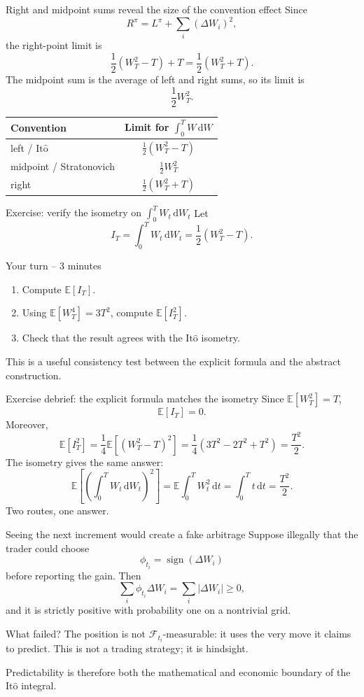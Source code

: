 \documentclass[10pt,aspectratio=169]{beamer}
\newcommand{\E}{\mathbb E}
\newcommand{\F}{\mathcal F}
\newcommand{\dd}{\,\mathrm d}
\newcommand{\Ito}{\mathrm{It\hat{o}}}
\begin{document}
\begin{frame}{Right and midpoint sums reveal the size of the convention effect}
Since
\[
R^\pi=L^\pi+\sum_i(\Delta W_i)^2,
\]
the right-point limit is
\[
\frac12(W_T^2-T)+T
=\frac12(W_T^2+T).
\]
The midpoint sum is the average of left and right sums, so its limit is
\[
\frac12W_T^2.
\]
\begin{center}
\begin{tabular}{lc}
\toprule
Convention & Limit for \(\int_0^T W\dd W\) \\
\midrule
left / \(\Ito\) & \(\frac12(W_T^2-T)\) \\
midpoint / Stratonovich & \(\frac12W_T^2\) \\
right & \(\frac12(W_T^2+T)\) \\
\bottomrule
\end{tabular}
\end{center}
\end{frame}

\begin{frame}{Exercise: verify the isometry on \(\int_0^T W_t\dd W_t\)}
Let
\[
I_T=\int_0^T W_t\dd W_t
=\frac12(W_T^2-T).
\]
\begin{block}{Your turn -- 3 minutes}
\begin{enumerate}\setlength{\itemsep}{0.55em}
  \item Compute \(\E[I_T]\).
  \item Using \(\E[W_T^4]=3T^2\), compute \(\E[I_T^2]\).
  \item Check that the result agrees with the \(\Ito\) isometry.
\end{enumerate}
\end{block}
This is a useful consistency test between the explicit formula and the abstract construction.
\end{frame}

\begin{frame}{Exercise debrief: the explicit formula matches the isometry}
Since \(\E[W_T^2]=T\),
\[
\E[I_T]=0.
\]
Moreover,
\[
\E[I_T^2]
=\frac14\E[(W_T^2-T)^2]
=\frac14(3T^2-2T^2+T^2)
=\frac{T^2}{2}.
\]
The isometry gives the same answer:
\[
\E\left[\left(\int_0^T W_t\dd W_t\right)^2\right]
=\E\int_0^T W_t^2\dd t
=\int_0^T t\dd t
=\frac{T^2}{2}.
\]
Two routes, one answer.
\end{frame}

\begin{frame}{Seeing the next increment would create a fake arbitrage}
Suppose illegally that the trader could choose
\[
\phi_{t_i}=\operatorname{sign}(\Delta W_i)
\]
before reporting the gain. Then
\[
\sum_i\phi_{t_i}\Delta W_i
=\sum_i|\Delta W_i|\ge0,
\]
and it is strictly positive with probability one on a nontrivial grid.
\begin{block}{What failed?}
The position is not \(\F_{t_i}\)-measurable: it uses the very move it claims to predict. This is not a trading strategy; it is hindsight.
\end{block}
Predictability is therefore both the mathematical and economic boundary of the \(\Ito\) integral.
\end{frame}
\end{document}
